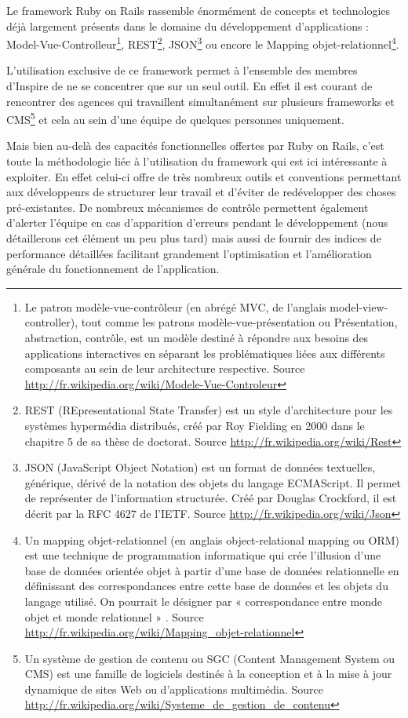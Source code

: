 \documentclass[12pt,a4paper]{book}
\begin{document}
Le framework Ruby on Rails rassemble énormément de concepts et technologies déjà largement présents dans le domaine du développement d'applications : Model-Vue-Controlleur\footnote{Le patron modèle-vue-contrôleur (en abrégé MVC, de l'anglais model-view-controller), tout comme les patrons modèle-vue-présentation ou Présentation, abstraction, contrôle, est un modèle destiné à répondre aux besoins des applications interactives en séparant les problématiques liées aux différents composants au sein de leur architecture respective. Source \url{http://fr.wikipedia.org/wiki/Modele-Vue-Controleur}}, REST\footnote{REST (REpresentational State Transfer) est un style d’architecture pour les systèmes hypermédia distribués, créé par Roy Fielding en 2000 dans le chapitre 5 de sa thèse de doctorat. Source \url{http://fr.wikipedia.org/wiki/Rest}}, JSON\footnote{JSON (JavaScript Object Notation) est un format de données textuelles, générique, dérivé de la notation des objets du langage ECMAScript. Il permet de représenter de l’information structurée. Créé par Douglas Crockford, il est décrit par la RFC 4627 de l’IETF. Source \url{http://fr.wikipedia.org/wiki/Json}} ou encore le Mapping objet-relationnel\footnote{Un mapping objet-relationnel (en anglais object-relational mapping ou ORM) est une technique de programmation informatique qui crée l'illusion d'une base de données orientée objet à partir d'une base de données relationnelle en définissant des correspondances entre cette base de données et les objets du langage utilisé. On pourrait le désigner par « correspondance entre monde objet et monde relationnel » . Source \url{http://fr.wikipedia.org/wiki/Mapping_objet-relationnel}}.

L'utilisation exclusive de ce framework permet à l'ensemble des membres d'Inspire de ne se concentrer que sur un seul outil. En effet il est courant de rencontrer des agences qui travaillent simultanément sur plusieurs frameworks et CMS\footnote{Un système de gestion de contenu ou SGC (Content Management System ou CMS) est une famille de logiciels destinés à la conception et à la mise à jour dynamique de sites Web ou d'applications multimédia. Source \url{http://fr.wikipedia.org/wiki/Systeme_de_gestion_de_contenu}} et cela au sein d'une équipe de quelques personnes uniquement.

Mais bien au-delà des capacités fonctionnelles offertes par Ruby on Rails, c'est toute la méthodologie liée à l'utilisation du framework qui est ici intéressante à exploiter. En effet celui-ci offre de très nombreux outils et conventions permettant aux développeurs de structurer leur travail et d'éviter de redévelopper des choses pré-existantes. De nombreux mécanismes de contrôle permettent également d'alerter l'équipe en cas d'apparition d'erreurs pendant le développement (nous détaillerons cet élément un peu plus tard) mais aussi de fournir des indices de performance détaillées facilitant grandement l'optimisation et l'amélioration générale du fonctionnement de l'application.
\end{document}
